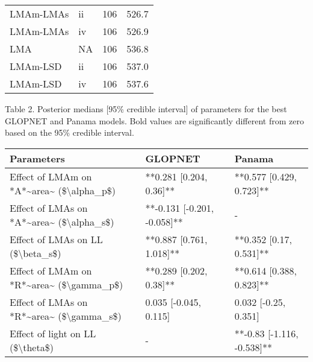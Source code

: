 \documentclass[
  12pt,
  letterpaper,
  DIV=11,
  numbers=noendperiod]{scrartcl}
\begin{document}
\begin{table}
\begin{tabular}{llrr}
\hspace{1em}LMAm-LMAs & ii & 106 & 526.7\\
\hspace{1em}LMAm-LMAs & iv & 106 & 526.9\\
\hspace{1em}LMA & NA & 106 & 536.8\\
\hspace{1em}LMAm-LSD & ii & 106 & 537.0\\
\hspace{1em}LMAm-LSD & iv & 106 & 537.6\\
\bottomrule
\end{tabular}
\end{table}

\newpage

Table 2. Posterior medians {[}95\% credible interval{]} of parameters
for the best GLOPNET and Panama models. Bold values are significantly
different from zero based on the 95\% credible interval.

\begin{longtable*}[t]{lll}
\toprule
Parameters & GLOPNET & Panama\\
\midrule
Effect of LMAm on *A*\textasciitilde{}area\textasciitilde{} (\$\textbackslash{}alpha\_p\$) & **0.281 [0.204, 0.36]** & **0.577 [0.429, 0.723]**\\
Effect of LMAs on *A*\textasciitilde{}area\textasciitilde{} (\$\textbackslash{}alpha\_s\$) & **-0.131 [-0.201, -0.058]** & -\\
Effect of LMAs on LL (\$\textbackslash{}beta\_s\$) & **0.887 [0.761, 1.018]** & **0.352 [0.17, 0.531]**\\
Effect of LMAm on *R*\textasciitilde{}area\textasciitilde{} (\$\textbackslash{}gamma\_p\$) & **0.289 [0.202, 0.38]** & **0.614 [0.388, 0.823]**\\
Effect of LMAs on *R*\textasciitilde{}area\textasciitilde{} (\$\textbackslash{}gamma\_s\$) & 0.035 [-0.045, 0.115] & 0.032 [-0.25, 0.351]\\
\addlinespace
Effect of light on LL (\$\textbackslash{}theta\$) & - & **-0.83 [-1.116, -0.538]**\\
\bottomrule
\end{longtable*}

\newpage
\end{document}
